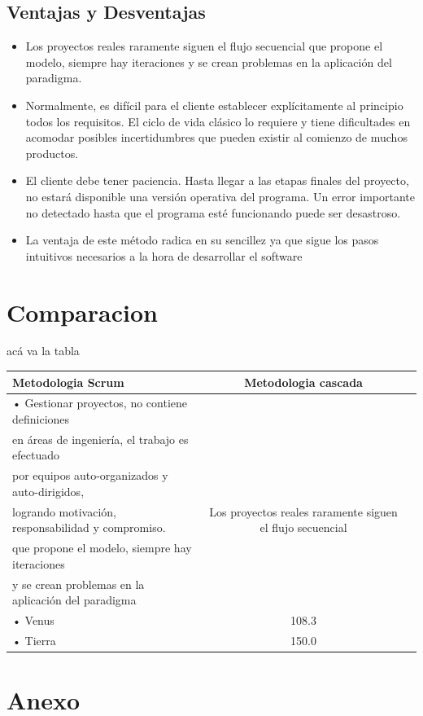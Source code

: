 \documentclass[10pt]{article}
\begin{document}
\subsection{Ventajas y Desventajas}
\begin{itemize}
\item 	Los proyectos reales raramente siguen el flujo secuencial que propone el modelo, siempre hay iteraciones y se crean problemas en la aplicación del paradigma.
\item 	Normalmente, es difícil para el cliente establecer explícitamente al principio  todos los requisitos. El ciclo de vida clásico lo requiere y tiene dificultades en acomodar posibles incertidumbres que pueden existir al comienzo de muchos productos.
\item 	El cliente debe tener paciencia. Hasta llegar a las etapas finales del proyecto, no estará disponible una versión operativa del programa. Un error importante no detectado hasta que el programa esté funcionando puede ser desastroso.
\item La ventaja de este método radica en su sencillez ya que sigue los pasos intuitivos necesarios a la hora de desarrollar el software
\end{itemize}




\newpage
\section{Comparacion}
acá va la tabla

\begin{tabular}{|lc|l|} \hline
\multicolumn{1}{|p{5cm}|}{\centering %
Metodologia Scrum} & \multicolumn{1}{|p{5cm}|}{\centering %
Metodologia cascada} \tabularnewline \hline
 • Gestionar  proyectos, no contiene definiciones\\ 
en áreas de ingeniería, el trabajo es efectuado\\ 
por equipos auto-organizados y auto-dirigidos, \\
logrando motivación, responsabilidad y compromiso.  &  Los proyectos reales raramente siguen el flujo secuencial\\
que propone el modelo, siempre hay iteraciones\\
y se crean problemas en la aplicación del paradigma \\
 • Venus & 108.3 \\ 
 • Tierra & 150.0 \\ \hline
\end{tabular}





\section{Anexo}
\end{document}
